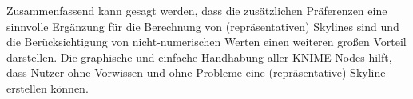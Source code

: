 Zusammenfassend kann gesagt werden, dass die zusätzlichen Präferenzen eine sinnvolle Ergänzung für die Berechnung von (repräsentativen) Skylines sind und die Berücksichtigung von nicht-numerischen Werten einen weiteren großen Vorteil darstellen. Die graphische und einfache Handhabung aller KNIME Nodes hilft, dass Nutzer ohne Vorwissen und ohne Probleme eine (repräsentative) Skyline erstellen können. 
